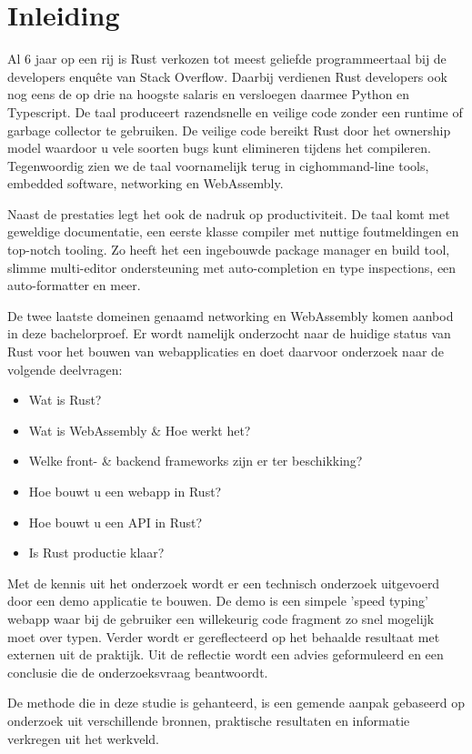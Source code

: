 \chapter{Inleiding}

Al 6 jaar op een rij is Rust verkozen tot meest geliefde programmeertaal bij de developers enquête
van Stack Overflow. Daarbij verdienen Rust developers ook nog eens de op drie na hoogste salaris en
versloegen daarmee Python en Typescript. \cite{so_enquete} De taal produceert razendsnelle en
veilige code zonder een runtime of garbage collector te gebruiken. De veilige code bereikt Rust door
het ownership model waardoor u vele soorten bugs kunt elimineren tijdens het compileren.
Tegenwoordig zien we de taal voornamelijk terug in cighommand-line tools, embedded software, networking
en WebAssembly.


Naast de prestaties legt het ook de nadruk op productiviteit. De taal komt met geweldige
documentatie, een eerste klasse compiler met nuttige foutmeldingen en top-notch tooling. Zo heeft
het een ingebouwde package manager en build tool, slimme multi-editor ondersteuning met
auto-completion en type inspections, een auto-formatter en meer. \cite{rustlang}

De twee laatste domeinen genaamd networking en WebAssembly komen aanbod in deze bachelorproef. 
Er wordt namelijk onderzocht naar de huidige status van Rust voor het bouwen van webapplicaties en
doet daarvoor onderzoek naar de volgende deelvragen:
\begin{itemize}
  \item Wat is Rust?
  \item Wat is WebAssembly \& Hoe werkt het?
  \item Welke front- \& backend frameworks zijn er ter beschikking?
  \item Hoe bouwt u een webapp in Rust?
  \item Hoe bouwt u een API in Rust?
  \item Is Rust productie klaar?
\end{itemize}

Met de kennis uit het onderzoek wordt er een technisch onderzoek uitgevoerd door een demo applicatie
te bouwen. De demo is een simpele 'speed typing' webapp waar bij de gebruiker een willekeurig code
fragment zo snel mogelijk moet over typen. Verder wordt er gereflecteerd op het behaalde resultaat
met externen uit de praktijk. Uit de reflectie wordt een advies geformuleerd en een conclusie die de
onderzoeksvraag beantwoordt.

De methode die in deze studie is gehanteerd, is een gemende aanpak gebaseerd op onderzoek uit
verschillende bronnen, praktische resultaten en informatie verkregen uit het werkveld.
